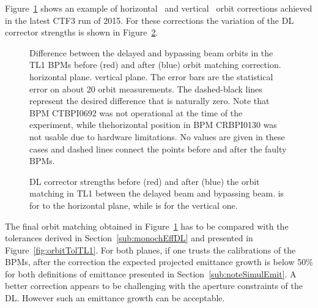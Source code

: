 Figure~\ref{fig:orbitCorrectionDLmatching} shows an example of horizontal~ and vertical~ orbit corrections achieved in the latest
CTF3 run of 2015.
For these corrections the variation of the DL corrector strengths is shown in
Figure~\ref{fig:correctorsCorrectionDLmatching}.
%
\begin{figure}[htbp]
  \qquad
  \caption{Difference between the delayed and bypassing beam orbits in the TL1 BPMs before
           (red) and after (blue) orbit matching correction.
           \protect{}  horizontal plane.
           \protect{} vertical plane.
           The error bars are the statistical error on about 20 orbit measurements.
           The dashed-black lines represent the desired difference that is naturally zero.
           Note that BPM CTBPI0692 was not operational at the time of the experiment, while
           thehorizontal position in BPM CRBPI0130 was not usable due to hardware limitations.
           No values are given in these cases and dashed lines connect the points before and
           after the faulty BPMs.
  }
  \label{fig:orbitCorrectionDLmatching}
\end{figure}
%
%
\begin{figure}[htbp]
\qquad
{}
\caption{DL corrector strengths before (red) and after (blue) the orbit matching in TL1
between the delayed beam and bypassing beam. 
\protect{} is for to the horizontal plane, while
\protect{} is for the vertical one.
}
\label{fig:correctorsCorrectionDLmatching}
\end{figure}
%
The final orbit matching obtained in Figure~\ref{fig:orbitCorrectionDLmatching} has to be
compared with the tolerances derived in Section~\ref{sub:monochEffDL} and presented in
Figure~\ref{fig:orbitTolTL1}.
For both planes, if one trusts the calibrations of the BPMs, after the correction the
expected projected emittance growth is below 50\% for both definitions of emittance
presented in Section~\ref{sub:noteSimulEmit}.
A better correction appears to be challenging with the aperture constraints of the DL.
However such an emittance growth can be acceptable.

